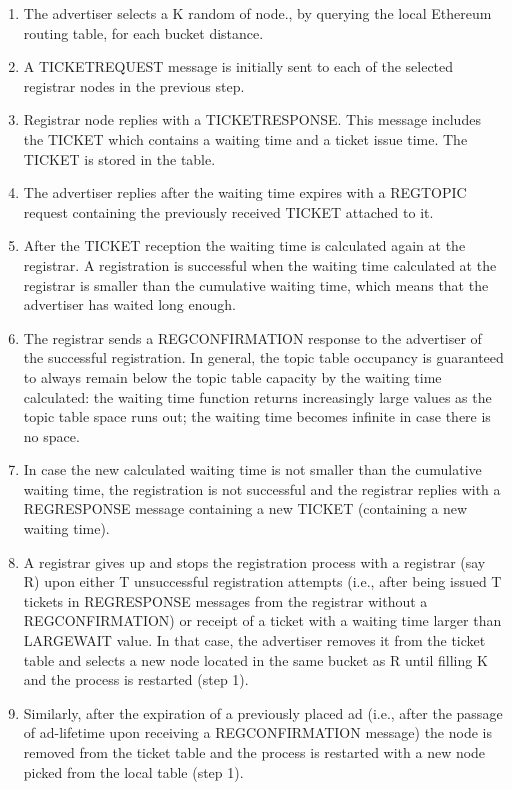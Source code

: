 \begin{enumerate}
    \item The advertiser selects a K random of node.,  by querying the local Ethereum routing table,  for each bucket distance.
    \item A TICKETREQUEST message is initially sent to each of the selected registrar nodes in the previous step.
    \item Registrar node replies with a TICKETRESPONSE.  This message includes the TICKET which contains a waiting time and a ticket issue time.  The TICKET is stored in the table.
    \item The advertiser replies after the waiting time expires with a REGTOPIC request containing the previously received TICKET attached to it.
    \item After the TICKET reception the waiting time is calculated again at the registrar.  A registration is successful when the waiting time calculated at the registrar is smaller than the cumulative waiting time,  which means that the advertiser has waited long enough.
    \item The registrar sends a REGCONFIRMATION response to the advertiser of the successful registration. In general, the topic table occupancy is guaranteed to always remain below the topic table capacity by the waiting time calculated: the waiting time function returns increasingly large values as the topic table space runs out; the waiting time becomes infinite in case there is no space.
    \item In case the new calculated waiting time is not smaller than the cumulative waiting time, the registration is not successful and the registrar replies with a REGRESPONSE message containing a new TICKET (containing a new waiting time).
    \item A registrar gives up and stops the registration process with a registrar (say R) upon either T unsuccessful registration attempts (i.e., after being issued T tickets in REGRESPONSE messages from the registrar without a REGCONFIRMATION) or receipt of a ticket with a waiting time larger than LARGEWAIT value.  In that case,  the advertiser removes it from the ticket table and selects a new node located in the same bucket as R until filling K and the process is restarted (step 1).
    \item Similarly,  after the expiration of a previously placed ad (i.e., after the passage of ad-lifetime upon receiving a REGCONFIRMATION message) the node is removed from the ticket table and the process is restarted with a new node picked from the local table (step 1).
\end{enumerate}

